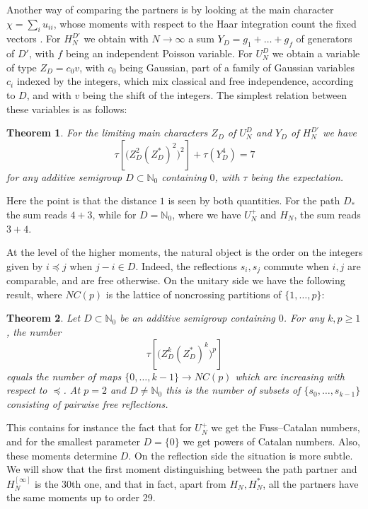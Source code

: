\documentclass[11pt,a4paper]{article}
\newtheorem{introthm}{Theorem}
\begin{document}
Another way of comparing the partners is by looking at the main character $\chi=\sum_iu_{ii}$, whose moments with respect to the Haar integration count the fixed vectors \cite{bs,wor}. For $H_N^{D'}$ we obtain with $N\to\infty$ a sum $Y_D=g_1+\ldots+g_f$ of generators of $D'$, with $f$ being an independent Poisson variable. For $U_N^D$ we obtain a variable of type $Z_D=c_0v$, with $c_0$ being Gaussian, part of a family of Gaussian variables $c_i$ indexed by the integers, which mix classical and free independence, according to $D$, and with $v$ being the shift of the integers. The simplest relation between these variables is as follows:

\begin{introthm}\label{intro-seven}
For the limiting main characters $Z_D$ of $U_N^D$ and $Y_D$ of $H_N^{D'}$ we have
\[
 \tau\!\left[\bigl(Z_D^2(Z_D^*)^2\bigr)^2\right]+\tau(Y_D^4)=7
\]
for any additive semigroup $D\subset\mathbb N_0$ containing $0$, with $\tau$ being the expectation.
\end{introthm}

Here the point is that the distance $1$ is seen by both quantities. For the path $D_*$ the sum reads $4+3$, while for $D=\mathbb N_0$, where we have $U_N^+$ and $H_N$, the sum reads $3+4$.

At the level of the higher moments, the natural object is the order on the integers given by $i\preceq j$ when $j-i\in D$. Indeed, the reflections $s_i,s_j$ commute when $i,j$ are comparable, and are free otherwise. On the unitary side we have the following result, where $NC(p)$ is the lattice of noncrossing partitions of $\{1,\ldots,p\}$:

\begin{introthm}\label{intro-order}
Let $D\subset\mathbb N_0$ be an additive semigroup containing $0$. For any $k,p\geq1$, the number
\[
 \tau\!\left[\bigl(Z_D^k(Z_D^*)^k\bigr)^p\right]
\]
equals the number of maps $\{0,\ldots,k-1\}\to NC(p)$ which are increasing with respect to $\preceq$. At $p=2$ and $D\neq\mathbb N_0$ this is the number of subsets of $\{s_0,\ldots,s_{k-1}\}$ consisting of pairwise free reflections.
\end{introthm}

This contains for instance the fact that for $U_N^+$ we get the Fuss--Catalan numbers, and for the smallest parameter $D=\{0\}$ we get powers of Catalan numbers. Also, these moments determine $D$. On the reflection side the situation is more subtle. We will show that the first moment distinguishing between the path partner and $H_N^{[\infty]}$ is the 30th one, and that in fact, apart from $H_N,H_N^*$, all the partners have the same moments up to order 29.
\end{document}
